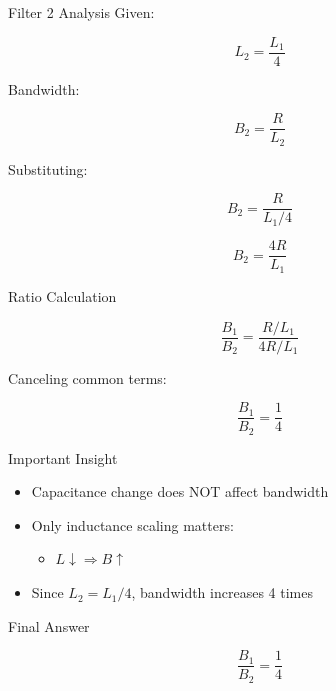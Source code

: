 \documentclass{beamer}
\begin{document}
\begin{frame}{Filter 2 Analysis}
Given:

\[
L_2 = \frac{L_1}{4}
\]

Bandwidth:

\[
B_2 = \frac{R}{L_2}
\]

Substituting:

\[
B_2 = \frac{R}{L_1/4}
\]

\[
B_2 = \frac{4R}{L_1}
\]

\end{frame}

\begin{frame}{Ratio Calculation}

\[
\frac{B_1}{B_2} = \frac{R/L_1}{4R/L_1}
\]

Canceling common terms:

\[
\frac{B_1}{B_2} = \frac{1}{4}
\]

\end{frame}

\begin{frame}{Important Insight}

\begin{itemize}
\item Capacitance change does NOT affect bandwidth
\item Only inductance scaling matters:
\begin{itemize}
\item $L \downarrow \Rightarrow B \uparrow$
\end{itemize}
\item Since $L_2 = L_1/4$, bandwidth increases 4 times
\end{itemize}

\end{frame}

\begin{frame}{Final Answer}

\[
\boxed{\frac{B_1}{B_2} = \frac{1}{4}}
\]

\end{frame}

\end{document}
